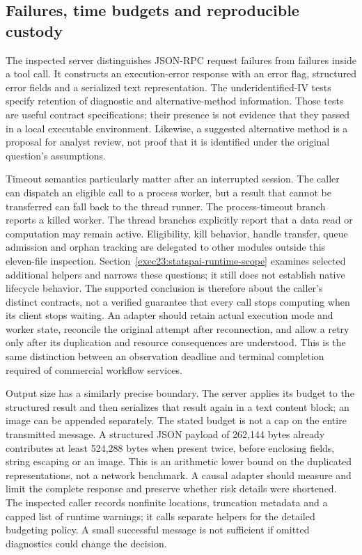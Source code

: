 \subsection{Failures, time budgets and reproducible custody}
\label{exec23:statspai-contract-runtime}
The inspected server distinguishes JSON-RPC request failures from failures
inside a tool call. It constructs an execution-error response with an error
flag, structured error fields and a serialized text representation. The
underidentified-IV tests specify retention of diagnostic and alternative-method
information. Those tests are useful contract specifications; their presence
is not evidence that they passed in a local executable environment. Likewise,
a suggested alternative method is a proposal for analyst review, not proof
that it is identified under the original question's assumptions.
\citep{exec23_statspai_contract}

Timeout semantics particularly matter after an interrupted session. The caller
can dispatch an eligible call to a process worker, but a result that cannot be
transferred can fall back to the thread runner. The process-timeout branch
reports a killed worker. The thread branches explicitly report that a data read
or computation may remain active. Eligibility, kill behavior, handle transfer,
queue admission and orphan tracking are delegated to other modules outside this eleven-file inspection. Section~\ref{exec23:statspai-runtime-scope} examines selected additional helpers and narrows these questions; it still does not establish native lifecycle behavior. The supported conclusion is therefore
about the caller's distinct contracts, not a verified guarantee that every
call stops computing when its client stops waiting. An adapter should retain
actual execution mode and worker state, reconcile the original attempt after
reconnection, and allow a retry only after its duplication and resource
consequences are understood. This is the same distinction between an
observation deadline and terminal completion required of commercial workflow
services.
\citep{exec23_statspai_contract}

Output size has a similarly precise boundary. The server applies its budget
to the structured result and then serializes that result again in a text
content block; an image can be appended separately. The stated budget is not
a cap on the entire transmitted message. A structured JSON payload of
262,144 bytes already contributes at least 524,288 bytes when present twice,
before enclosing fields, string escaping or an image. This is an arithmetic
lower bound on the duplicated representations, not a network benchmark.
A causal adapter should measure and limit the complete response and preserve
whether risk details were shortened. The inspected caller records nonfinite
locations, truncation metadata and a capped list of runtime warnings; it calls
separate helpers for the detailed budgeting policy. A small successful message
is not sufficient if omitted diagnostics could change the decision.
\citep{exec23_statspai_contract,exec23_statspai_contract_reference}

